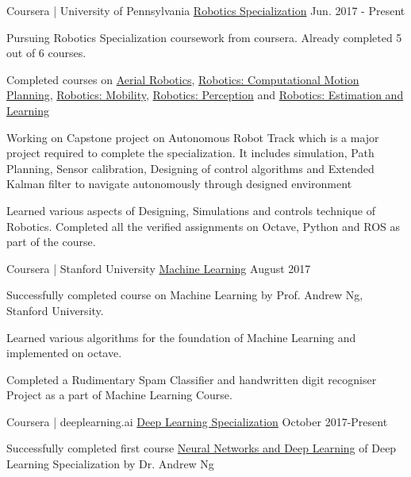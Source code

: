 \begin{cventries}
  \cventry
    {Coursera | University of Pennsylvania}
    {\href{https://drive.google.com/open?id=0B0SiIiwo-oPobkU3UDlBY3RXVTQ}{Robotics Specialization}}
    {}
    {Jun. 2017 - Present}
    {
      \begin{cvitems}
        \item {Pursuing Robotics Specialization coursework from coursera. Already completed 5 out of 6 courses.}
        \item {Completed courses on \href{https://www.coursera.org/account/accomplishments/certificate/QS5GBKTUNU2G}{Aerial Robotics},  \href{https://www.coursera.org/account/accomplishments/certificate/MQZ2DBARND8Y}{Robotics: Computational Motion Planning}, \href{https://www.coursera.org/account/accomplishments/verify/CDK6J2QNMV7Y}{Robotics: Mobility},   \href{https://www.coursera.org/account/accomplishments/verify/MY9843D7KFDY}{Robotics: Perception} and  \href{https://www.coursera.org/account/accomplishments/verify/UBPR6FJU9Q47}{Robotics: Estimation and Learning}}
        \item {Working on Capstone project on Autonomous Robot Track which is a major project required to complete the specialization. It includes simulation, Path Planning, Sensor calibration, Designing of control algorithms and Extended Kalman filter to navigate autonomously through designed environment}
        \item {Learned various aspects of Designing, Simulations and controls technique of Robotics. Completed all the verified assignments on Octave, Python and ROS as part of the course.}
      \end{cvitems}
}      

 \cventry
    {Coursera | Stanford University}
    { \href{https://www.coursera.org/account/accomplishments/certificate/9SSNE58D35EH}{Machine Learning}}
    {}
    {August 2017}
    {
      \begin{cvitems}
        \item {Successfully completed course on Machine Learning by Prof. Andrew Ng, Stanford University.}
        \item {Learned various algorithms for the foundation of Machine Learning and implemented on octave.}
        \item {Completed a Rudimentary Spam Classifier and handwritten digit recogniser Project as a part of Machine Learning Course.}\\
      \end{cvitems}
}
\cventry
    {Coursera | deeplearning.ai}
    { \href{https://drive.google.com/open?id=0B0SiIiwo-oPoOEhTenpjRGpiNUE}{Deep Learning Specialization}}
    {}
    {October 2017-Present}
    {
      \begin{cvitems}
        \item {Successfully completed  first course \href{https://www.coursera.org/account/accomplishments/certificate/RWG9PBQF5MK9}{Neural Networks and Deep Learning} of Deep Learning Specialization by Dr. Andrew Ng}
      \end{cvitems}
}
\end{cventries}